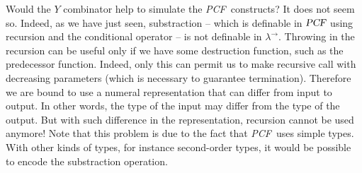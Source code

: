 \documentclass{article}
\newcommand{\encode}[1]{\ulcorner #1 \urcorner}
\newcommand{\nat}{\mathbb{N}}
\newcommand{\betared}{\rightarrow_\beta}
\newcommand\pcf{\textsl{PCF}}
\begin{document}
Would the $Y$ combinator help to simulate the \pcf\ constructs? It
does not seem so. Indeed, as we have just seen, substraction --
which is definable in $\pcf$ using recursion and the conditional
operator -- is not definable in $\lambda^\rightarrow$. Throwing in
the recursion can be useful only if we have some destruction
function, such as the predecessor function. Indeed, only this can
permit us to make recursive call with decreasing parameters (which
is necessary to guarantee termination). Therefore we are bound to
use a numeral representation that can differ from input to output.
In other words, the type of the input may differ from the type of
the output. But with such difference in the representation,
recursion cannot be used anymore! Note that this problem is due to
the fact that \pcf\ uses simple types. With other kinds of types,
for instance second-order types, it would be possible to encode the
substraction operation.

%
%
%



\end{document}
